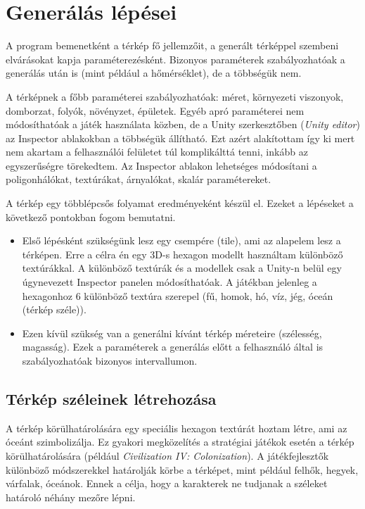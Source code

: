 \section{Generálás lépései}

A program bemenetként a térkép fő jellemzőit, a generált térképpel szembeni elvárásokat kapja paraméterezésként. Bizonyos paraméterek szabályozhatóak a generálás után is (mint például a hőmérséklet), de a többségük nem.

A térképnek a főbb paraméterei szabályozhatóak: méret, környezeti viszonyok, domborzat, folyók, növényzet, épületek. Egyéb apró paraméterei nem módosíthatóak a játék használata közben, de a Unity szerkesztőben (\textit{Unity editor}) az Inspector ablakokban a többségük állítható. Ezt azért alakítottam így ki mert nem akartam a felhasználói felületet túl komplikálttá tenni, inkább az egyszerűségre törekedtem. Az Inspector ablakon lehetséges módosítani a poligonhálókat, textúrákat, árnyalókat, skalár paramétereket.

\newpage
A térkép egy többlépcsős folyamat eredményeként készül el. Ezeket a lépéseket a következő pontokban fogom bemutatni.
\begin{itemize}
\item Első lépésként szükségünk lesz egy csempére (tile), ami az alapelem lesz a térképen. Erre a célra én egy 3D-s hexagon modellt használtam különböző textúrákkal. A különböző textúrák és a modellek csak a Unity-n belül egy úgynevezett Inspector panelen módosíthatóak. A játékban jelenleg a hexagonhoz 6 különböző textúra szerepel (fű, homok, hó, víz, jég, óceán (térkép széle)).
\item Ezen kívül szükség van a generálni kívánt térkép méreteire (szélesség, magasság). Ezek a paraméterek a generálás előtt a felhasználó által is szabályozhatóak bizonyos intervallumon.
\end{itemize}

\subsection{Térkép széleinek létrehozása}

A térkép körülhatárolására egy speciális hexagon textúrát hoztam létre, ami az óceánt szimbolizálja. Ez gyakori megközelítés a stratégiai játékok esetén a térkép körülhatárolására (például \textit{Civilization IV: Colonization}). A játékfejlesztők különböző módszerekkel határolják körbe a térképet, mint például felhők, hegyek, várfalak, óceánok. Ennek a célja, hogy a karakterek ne tudjanak a széleket határoló néhány mezőre lépni.

